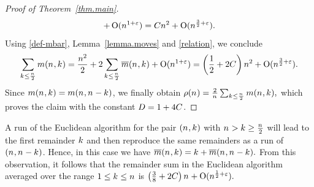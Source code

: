\begin{proof}[Proof of Theorem~\ref{thm.main}]
\[{        +
        \operatorname{O}(n_{}^{ 1  +\varepsilon})} =  C n_{}^2
      +
      \operatorname{O}(n_{}^{\frac32 + \varepsilon}).
    \]
    Using \eqref{def-mbar},
    Lemma~\ref{lemma.moves} and \eqref{relation}, we conclude
    \[
      \Sum[\Shift\leq\frac{\Size}{2}]{
        \MovesOf{\Size}{\Shift}
      }
      =
      \frac{\Size^2}{2}
      +
      2
      \Sum[\Shift\leq\frac{\Size}{2}]{
        \RemainderSumOf{\Size}{\Shift}
      }
      +
      \BigO{\Size^{1+\TheEpsilon}}
      =
      \Parens{\frac12 + 2\TheZetaConst}\Size^2
      +
      \BigO{\Size^{\frac32+\TheEpsilon}}
      .
    \]
    Since $m(n_{},k_{})=m(n_{},n_{}-k_{})$,
    we finally obtain
   $
      \AvgCostOf{\Size}
      =
      \frac{2}{\Size}
      \Sum[\Shift\leq\frac{\Size}{2}]{
        \MovesOf{\Size}{\Shift},
      }
   $
    which proves the claim with the constant
    \(
      D = 1 + 4 C
    \).
  \end{proof}

  \begin{remark}
    A run of the Euclidean algorithm for the pair $(n_{},k_{})$ with
    $n_{}>k_{}\geq\frac{n_{}}{2}$ will lead to the first remainder $k_{}$ and
    then reproduce the same remainders as a run of $(n_{},n_{}-k_{})$. Hence, in this
    case we have 
    $
      \overline{m}(n_{},k_{}) =
      k_{} + \overline{m}(n_{},n_{}-k_{}). 
    $
    From this observation, it follows that the remainder sum in the
    Euclidean algorithm averaged over the range $1\leq k_{}\leq n_{}$
    is 
    $
      \Parens{\frac38 + 2\TheZetaConst} \Size + \BigO{\Size^{\frac12 + \TheEpsilon}}. 
    $
  \end{remark}

